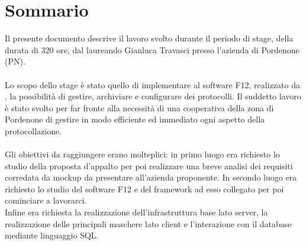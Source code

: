 
\cleardoublepage
{}
{}
\begingroup
\let\clearpage\relax
\let\cleardoublepage\relax
\let\cleardoublepage\relax

\chapter*{Sommario}

Il presente documento descrive il lavoro svolto durante il periodo di stage, della durata di 320 ore, dal laureando Gianluca Travasci presso l'azienda \myAzienda  di Pordenone (PN).
\\
\\
Lo scopo dello stage è stato quello di implementare al software F12, realizzato da \myAzienda, la possibilità di gestire, archiviare e configurare dei protocolli. Il suddetto lavoro è stato svolto per far fronte alla necessità di una cooperativa della zona di Pordenone di gestire in modo efficiente ed immediato ogni aspetto della protocollazione.
\\
\\
Gli obiettivi da raggiungere erano molteplici: in primo luogo era richiesto lo studio della proposta d'appalto per poi realizzare una breve analisi dei requisiti corredata da mockup da presentare all'azienda proponente.
In secondo luogo era richiesto lo studio del software F12 e del framework ad esso collegato per poi cominciare a lavorarci.\\
Infine era richiesta la realizzazione dell'infrastruttura base lato server, la realizzazione delle principali maschere lato client e l'interazione con il database mediante linguaggio SQL.

%
%

\endgroup			

\vfill


